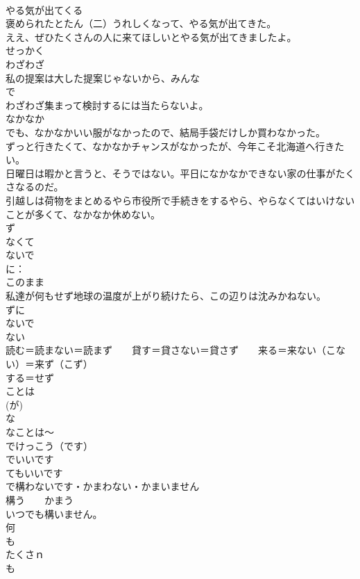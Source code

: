 \documentclass[8pt]{extreport}
\begin{document}
\begin{CJK}{UTF8}{min}
\\	やる気が出てくる
\\	褒められたとたん（二）うれしくなって、やる気が出てきた。
\\	ええ、ぜひたくさんの人に来てほしいとやる気が出てきましたよ。
\\	せっかく
\\	わざわざ
\\	私の提案は大した提案じゃないから、みんな
\\	で
\\	わざわざ集まって検討するには当たらないよ。
\\	なかなか
\\	でも、なかなかいい服がなかったので、結局手袋だけしか買わなかった。
\\	ずっと行きたくて、なかなかチャンスがなかったが、今年こそ北海道へ行きたい。
\\	日曜日は暇かと言うと、そうではない。平日になかなかできない家の仕事がたくさなるのだ。
\\	引越しは荷物をまとめるやら市役所で手続きをするやら、やらなくてはいけないことが多くて、なかなか休めない。
\\	ず
\\	なくて　
\\	ないで 
\\	に：
\\	このまま
\\	私達が何もせず地球の温度が上がり続けたら、この辺りは沈みかねない。
\\	ずに
\\	ないで
\\	ない 
\\	読む＝読まない＝読まず　　貸す＝貸さない＝貸さず　　来る＝来ない（こない）＝来ず（こず）　
\\	する＝せず	
\\	ことは
\\	(が)
\\	な
\\	なことは～	
\\	でけっこう（です）
\\	でいいです
\\	てもいいです
\\	で構わないです・かまわない・かまいません　
\\	構う　　かまう
\\	いつでも構いません。
\\	何
\\	も
\\	たくさｎ
\\	も

\end{CJK}
\end{document}

